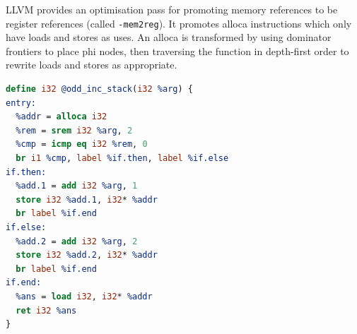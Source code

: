 LLVM provides an optimisation pass for promoting memory references to be register references (called \texttt{-mem2reg}).
It promotes alloca instructions which only have loads and stores as uses.
An alloca is transformed by using dominator frontiers to place phi nodes, then traversing the function in depth-first order to rewrite loads and stores as appropriate.

\begin{lstlisting}[language=llvm,style=nasm,caption={An example of the odd\_inc function implemented using data allocated on the stack frame.}, label={lst:ex:odd_inc_stack}]
define i32 @odd_inc_stack(i32 %arg) {
entry:
  %addr = alloca i32
  %rem = srem i32 %arg, 2
  %cmp = icmp eq i32 %rem, 0
  br i1 %cmp, label %if.then, label %if.else
if.then:
  %add.1 = add i32 %arg, 1
  store i32 %add.1, i32* %addr
  br label %if.end
if.else:
  %add.2 = add i32 %arg, 2
  store i32 %add.2, i32* %addr
  br label %if.end
if.end:
  %ans = load i32, i32* %addr
  ret i32 %ans
}
\end{lstlisting}





